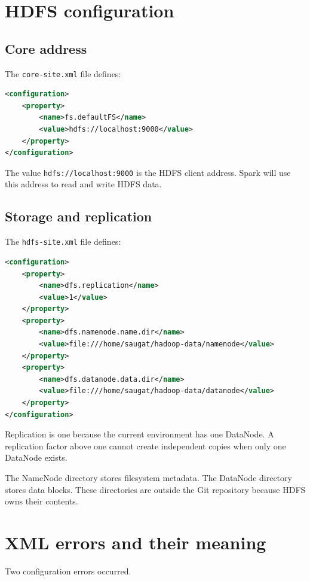 \documentclass[11pt,a4paper]{article}
\begin{document}
\section{HDFS configuration}

\subsection{Core address}

The \texttt{core-site.xml} file defines:

\begin{lstlisting}[language=XML]
<configuration>
    <property>
        <name>fs.defaultFS</name>
        <value>hdfs://localhost:9000</value>
    </property>
</configuration>
\end{lstlisting}

The value \texttt{hdfs://localhost:9000} is the HDFS client address. Spark will use this address to read and write HDFS data.

\subsection{Storage and replication}

The \texttt{hdfs-site.xml} file defines:

\begin{lstlisting}[language=XML]
<configuration>
    <property>
        <name>dfs.replication</name>
        <value>1</value>
    </property>
    <property>
        <name>dfs.namenode.name.dir</name>
        <value>file:///home/saugat/hadoop-data/namenode</value>
    </property>
    <property>
        <name>dfs.datanode.data.dir</name>
        <value>file:///home/saugat/hadoop-data/datanode</value>
    </property>
</configuration>
\end{lstlisting}

Replication is one because the current environment has one DataNode. A replication factor above one cannot create independent copies when only one DataNode exists.

The NameNode directory stores filesystem metadata. The DataNode directory stores data blocks. These directories are outside the Git repository because HDFS owns their contents.

\section{XML errors and their meaning}

Two configuration errors occurred.
\end{document}
